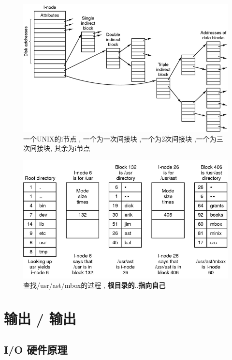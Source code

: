 \documentclass[UTF8,a4paper]{ctexart}
\begin{document}
\begin{figure}[H]
	\centering
	\includegraphics[scale = 0.6]{assets/ModernOperatingSystems/2018-01-08-19-49-31.png}
	\caption{一个UNIX的i节点 , 一个为一次间接块 ,一个为2次间接块 ,一个为三次间接块, 其余为i节点}
\end{figure}

\begin{figure}[H]
	\centering
	\includegraphics[scale = 0.6]{assets/ModernOperatingSystems/2018-01-08-19-50-18.png}
	\caption{查找/usr/ast/mbox的过程 , \textbf{根目录的$..$指向自己}}
\end{figure}

\section{输出 / 输出}
\subsection{I/O 硬件原理}
\end{document}
